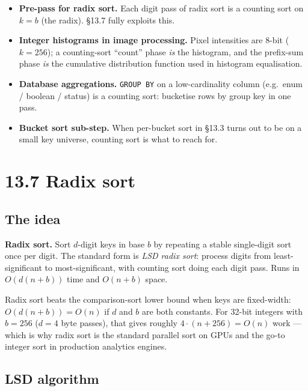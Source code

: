 \documentclass[11pt]{article}
\begin{document}
\begin{itemize}[leftmargin=*]
    \item \textbf{Pre-pass for radix sort.} Each digit pass of
          radix sort is a counting sort on $k = b$ (the radix).
          \S13.7 fully exploits this.
    \item \textbf{Integer histograms in image processing.} Pixel
          intensities are 8-bit ($k = 256$); a counting-sort
          ``count'' phase \emph{is} the histogram, and the
          prefix-sum phase \emph{is} the cumulative
          distribution function used in histogram equalisation.
    \item \textbf{Database aggregations.} \texttt{GROUP BY} on a
          low-cardinality column (e.g.\ enum / boolean / status)
          is a counting sort: bucketise rows by group key in
          one pass.
    \item \textbf{Bucket sort sub-step.} When per-bucket sort in
          \S13.3 turns out to be on a small key universe,
          counting sort is what to reach for.
\end{itemize}

\section{13.7 Radix sort}

\subsection*{The idea}

\begin{defnbox}
\textbf{Radix sort.} Sort $d$-digit keys in base $b$ by repeating
a stable single-digit sort once per digit. The standard form is
\emph{LSD radix sort}: process digits from least-significant to
most-significant, with counting sort doing each digit pass.
Runs in $O(d(n + b))$ time and $O(n + b)$ space.
\end{defnbox}

Radix sort beats the comparison-sort lower bound when keys are
fixed-width: $O(d(n + b)) = O(n)$ if $d$ and $b$ are both
constants. For 32-bit integers with $b = 256$ ($d = 4$ byte
passes), that gives roughly $4 \cdot (n + 256) = O(n)$ work --- which is
why radix sort is the standard parallel sort on GPUs and the
go-to integer sort in production analytics engines.

\subsection*{LSD algorithm}
\end{document}
